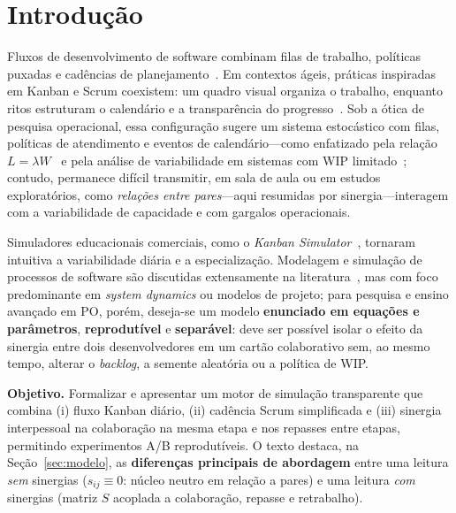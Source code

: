 \section{Introdução}

Fluxos de desenvolvimento de software combinam filas de trabalho, políticas puxadas e cadências de planejamento~\cite{poppendieck2003lean,anderson2010kanban,reinertsen2009principles}. Em contextos ágeis, práticas inspiradas em Kanban e Scrum coexistem: um quadro visual organiza o trabalho, enquanto ritos estruturam o calendário e a transparência do progresso~\cite{schwaber2002agile,schwaber2020scrum}. Sob a ótica de pesquisa operacional, essa configuração sugere um sistema estocástico com filas, políticas de atendimento e eventos de calendário---como enfatizado pela relação $L=\lambda W$~\cite{little1961proof} e pela análise de variabilidade em sistemas com WIP limitado~\cite{hopp2008factory}; contudo, permanece difícil transmitir, em sala de aula ou em estudos exploratórios, como \emph{relações entre pares}---aqui resumidas por sinergia---interagem com a variabilidade de capacidade e com gargalos operacionais.

Simuladores educacionais comerciais, como o \emph{Kanban Simulator}~\cite{kanbanSimulator}, tornaram intuitiva a variabilidade diária e a especialização. Modelagem e simulação de processos de software são discutidas extensamente na literatura~\cite{kellner1999software,madachy2008software}, mas com foco predominante em \emph{system dynamics} ou modelos de projeto; para pesquisa e ensino avançado em PO, porém, deseja-se um modelo \textbf{enunciado em equações e parâmetros}, \textbf{reprodutível} e \textbf{separável}: deve ser possível isolar o efeito da sinergia entre dois desenvolvedores em um cartão colaborativo sem, ao mesmo tempo, alterar o \emph{backlog}, a semente aleatória ou a política de WIP.

\textbf{Objetivo.} Formalizar e apresentar um motor de simulação transparente que combina (i) fluxo Kanban diário, (ii) cadência Scrum simplificada e (iii) sinergia interpessoal na colaboração na mesma etapa e nos repasses entre etapas, permitindo experimentos A/B reprodutíveis. O texto destaca, na Seção~\ref{sec:modelo}, as \textbf{diferenças principais de abordagem} entre uma leitura \emph{sem} sinergias ($s_{ij}\equiv 0$: núcleo neutro em relação a pares) e uma leitura \emph{com} sinergias (matriz $S$ acoplada a colaboração, repasse e retrabalho).

